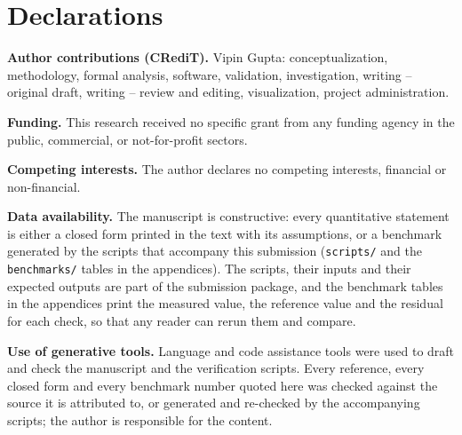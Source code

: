 \section*{Declarations}

\noindent\textbf{Author contributions (CRediT).}
Vipin Gupta: conceptualization, methodology, formal analysis, software, validation, investigation,
writing -- original draft, writing -- review and editing, visualization, project administration.

\noindent\textbf{Funding.}
This research received no specific grant from any funding agency in the public, commercial, or
not-for-profit sectors.

\noindent\textbf{Competing interests.}
The author declares no competing interests, financial or non-financial.

\noindent\textbf{Data availability.}
The manuscript is constructive: every quantitative statement is either a closed form printed in the text with its
assumptions, or a benchmark generated by the scripts that accompany this submission (\texttt{scripts/} and the
\texttt{benchmarks/} tables in the appendices). The scripts, their inputs and their expected outputs are part of
the submission package, and the benchmark tables in the appendices print the measured value, the reference value
and the residual for each check, so that any reader can rerun them and compare.

\noindent\textbf{Use of generative tools.}
Language and code assistance tools were used to draft and check the manuscript and the verification scripts.
Every reference, every closed form and every benchmark number quoted here was checked against the source it is
attributed to, or generated and re-checked by the accompanying scripts; the author is responsible for the content.
